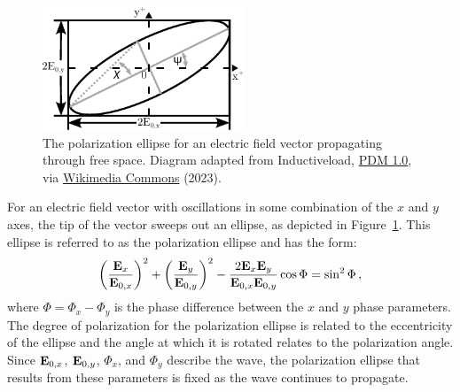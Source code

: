 \begin{figure}[t]
    \centering
    \includegraphics[width=6cm]{figures/2_pol_ellipse.pdf}
    \caption{The polarization ellipse for an electric field vector propagating through free space. Diagram adapted from Inductiveload, \protect\href{https://creativecommons.org/publicdomain/mark/1.0/}{PDM 1.0}, via \protect\href{https://commons.wikimedia.org/wiki/File:Polarisation_ellipse2.svg}{Wikimedia Commons} (2023).}
    \label{fig:pol_ellipse}
\end{figure}

For an electric field vector with oscillations in some combination of the $x$ and $y$ axes, the tip of the vector sweeps out an ellipse, as depicted in Figure~\ref{fig:pol_ellipse}. This ellipse is referred to as the polarization ellipse and has the form:
\begin{equation}
    \left( \frac{\mathbf{E}_{x}}{\mathbf{E}_{0, x}}\right)^{2} +
    \left( \frac{\mathbf{E}_{y}}{\mathbf{E}_{0, y}}\right)^{2} -
    \frac{2 \mathbf{E}_{x} \mathbf{E}_{y}}{\mathbf{E}_{0, x} \mathbf{E}_{0, y}} \cos\Phi =
    \sin^{2} \Phi\,,\label{eq:pol_ellipse}
\end{equation}
where $\Phi = \Phi_{x} - \Phi_{y}$ is the phase difference between the $x$ and $y$ phase parameters. The degree of polarization for the polarization ellipse is related to the eccentricity of the ellipse and the angle at which it is rotated relates to the polarization angle. Since $\mathbf{E}_{0, x}$, $\mathbf{E}_{0, y}$, $\Phi_{x}$, and $\Phi_{y}$ describe the wave, the polarization ellipse that results from these parameters is fixed as the wave continues to propagate.

